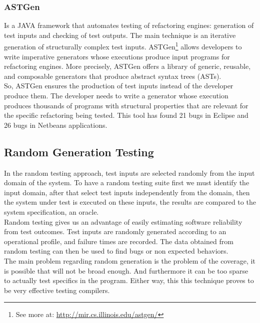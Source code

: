 \documentclass[10pt, conference, compsocconf]{IEEEtran}
\begin{document}
\subsubsection{\textbf{ASTGen}\cite{Daniel:2007:ATR:1287624.1287651}} Is a JAVA framework that automates testing of refactoring engines: generation of test inputs
and checking of test outputs. The main technique is an iterative generation of structurally complex test inputs.
ASTGen\footnote{See more at: \url{http://mir.cs.illinois.edu/astgen/}} allows developers to write imperative generators whose executions
produce input programs for refactoring engines. More precisely, ASTGen
offers a library of generic, reusable, and composable generators that produce abstract syntax trees (ASTs).\\
So, ASTGen ensures the production of test inputs instead of the developer produce them. The developer needs to write a generator whose execution
produces thousands of programs with structural properties that are relevant for the specific refactoring being tested. This tool has found
21 bugs in Eclipse and 26 bugs in Netbeans applications.

\subsection{Random Generation Testing}
In the random testing approach, test inputs are selected randomly from the input domain of the system.
To have a random testing suite first we must identify the input domain, after that select test inputs independently from the domain,
then the system under test is executed on these inputs, the results are compared to the system specification, an oracle.\\
Random testing gives us an advantage of easily estimating software reliability from test outcomes.
Test inputs are randomly generated according to an operational profile, and failure times are recorded.
The data obtained from random testing can then be used to find bugs or non expected behaviors.\\
\indent The main problem regarding random generation is the problem of the coverage, it is possible that will not be broad enough. And furthermore it can be
too sparse to actually test specifics in the program. Either way, this this technique proves to be very effective testing compilers.
\end{document}
